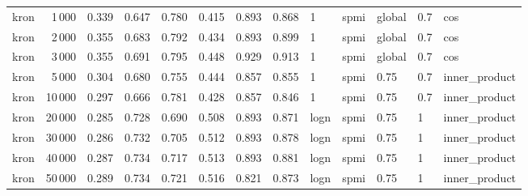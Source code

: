 \begin{tabular}{lrrrrrrrlllll}
    kron &            1\,000 &      0.339 &  0.647 &  0.780 &  0.415 &      0.893 &      0.868 &     1 &   spmi &  global &  0.7 &            cos \\
    kron &            2\,000 &      0.355 &  0.683 &  0.792 &  0.434 &      0.893 &      0.899 &     1 &   spmi &  global &  0.7 &            cos \\
    kron &            3\,000 &      0.355 &  0.691 &  0.795 &  0.448 &      0.929 &      0.913 &     1 &   spmi &  global &  0.7 &            cos \\
    kron &            5\,000 &      0.304 &  0.680 &  0.755 &  0.444 &      0.857 &      0.855 &     1 &   spmi &    0.75 &  0.7 &  inner\_product \\
    kron &           10\,000 &      0.297 &  0.666 &  0.781 &  0.428 &      0.857 &      0.846 &     1 &   spmi &    0.75 &  0.7 &  inner\_product \\
    kron &           20\,000 &      0.285 &  0.728 &  0.690 &  0.508 &      0.893 &      0.871 &  logn &   spmi &    0.75 &    1 &  inner\_product \\
    kron &           30\,000 &      0.286 &  0.732 &  0.705 &  0.512 &      0.893 &      0.878 &  logn &   spmi &    0.75 &    1 &  inner\_product \\
    kron &           40\,000 &      0.287 &  0.734 &  0.717 &  0.513 &      0.893 &      0.881 &  logn &   spmi &    0.75 &    1 &  inner\_product \\
    kron &           50\,000 &      0.289 &  0.734 &  0.721 &  0.516 &      0.821 &      0.873 &  logn &   spmi &    0.75 &    1 &  inner\_product \\
\bottomrule
\end{tabular}
